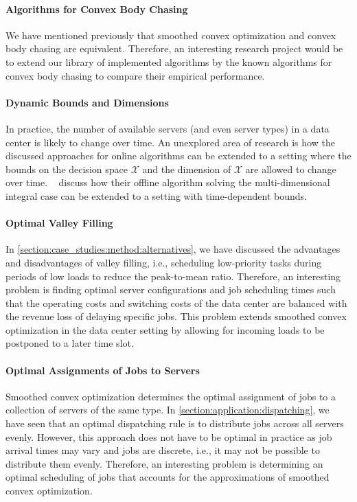 \paragraph{Algorithms for Convex Body Chasing} We have mentioned previously that smoothed convex optimization and convex body chasing are equivalent. Therefore, an interesting research project would be to extend our library of implemented algorithms by the known algorithms for convex body chasing to compare their empirical performance.

\paragraph{Dynamic Bounds and Dimensions} In practice, the number of available servers (and even server types) in a data center is likely to change over time. An unexplored area of research is how the discussed approaches for online algorithms can be extended to a setting where the bounds on the decision space $\mathcal{X}$ and the dimension of $\mathcal{X}$ are allowed to change over time. \citeauthor*{Albers2021_2}~\cite{Albers2021_2} discuss how their offline algorithm solving the multi-dimensional integral case can be extended to a setting with time-dependent bounds.

\paragraph{Optimal Valley Filling} In \cref{section:case_studies:method:alternatives}, we have discussed the advantages and disadvantages of valley filling, i.e., scheduling low-priority tasks during periods of low loads to reduce the peak-to-mean ratio. Therefore, an interesting problem is finding optimal server configurations and job scheduling times such that the operating costs and switching costs of the data center are balanced with the revenue loss of delaying specific jobs. This problem extends smoothed convex optimization in the data center setting by allowing for incoming loads to be postponed to a later time slot.

\paragraph{Optimal Assignments of Jobs to Servers} Smoothed convex optimization determines the optimal assignment of jobs to a collection of servers of the same type. In \cref{section:application:dispatching}, we have seen that an optimal dispatching rule is to distribute jobs across all servers evenly. However, this approach does not have to be optimal in practice as job arrival times may vary and jobs are discrete, i.e., it may not be possible to distribute them evenly. Therefore, an interesting problem is determining an optimal scheduling of jobs that accounts for the approximations of smoothed convex optimization.

